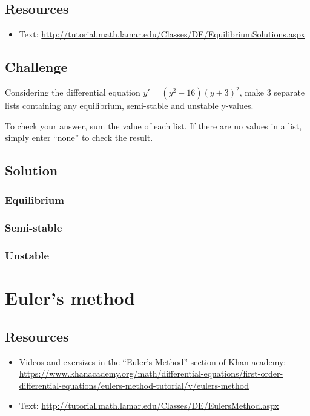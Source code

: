 \subsection*{Resources}
\begin{itemize}
    \item Text: \url{http://tutorial.math.lamar.edu/Classes/DE/EquilibriumSolutions.aspx}
\end{itemize}

\subsection*{Challenge}
Considering the differential equation $y'=(y^2-16)(y+3)^2$, make 3 separate lists containing any equilibrium, semi-stable and unstable y-values.

To check your answer, sum the value of each list. If there are no values in a list, simply enter ``none'' to check the result.

\subsection*{Solution}
\subsubsection*{Equilibrium}
\six{}


\subsubsection*{Semi-stable}
\six{}


\subsubsection*{Unstable}
\six{}


\timebox



\newpage
\section{Euler's method}

\subsection*{Resources}
\begin{itemize}
    \item Videos and exersizes in the ``Euler's Method'' section of Khan academy: \url{https://www.khanacademy.org/math/differential-equations/first-order-differential-equations/eulers-method-tutorial/v/eulers-method}
    \item Text: \url{http://tutorial.math.lamar.edu/Classes/DE/EulersMethod.aspx}
\end{itemize}

